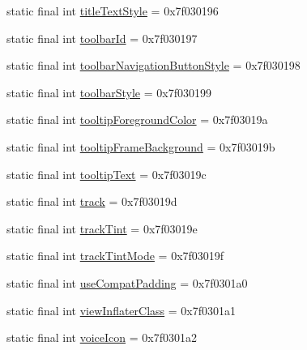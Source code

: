 \begin{DoxyCompactItemize}
\item 
static final int \mbox{\hyperlink{classandroid_1_1support_1_1design_1_1_r_1_1attr_a88a90fd7bafbbc05004a0a6e0420f6b9}{title\+Text\+Style}} = 0x7f030196
\item 
static final int \mbox{\hyperlink{classandroid_1_1support_1_1design_1_1_r_1_1attr_ae9f565520d2e78480db1dae46fccb81b}{toolbar\+Id}} = 0x7f030197
\item 
static final int \mbox{\hyperlink{classandroid_1_1support_1_1design_1_1_r_1_1attr_a9733b7b45c6e2fdfb80f9271d546762a}{toolbar\+Navigation\+Button\+Style}} = 0x7f030198
\item 
static final int \mbox{\hyperlink{classandroid_1_1support_1_1design_1_1_r_1_1attr_af57093ce0a51175955ed5221ab7b8067}{toolbar\+Style}} = 0x7f030199
\item 
static final int \mbox{\hyperlink{classandroid_1_1support_1_1design_1_1_r_1_1attr_ae847265357dd1bea6c55b9afd0710c84}{tooltip\+Foreground\+Color}} = 0x7f03019a
\item 
static final int \mbox{\hyperlink{classandroid_1_1support_1_1design_1_1_r_1_1attr_a098ba3f9d78cf2a09ce24aa2b4bfb1b6}{tooltip\+Frame\+Background}} = 0x7f03019b
\item 
static final int \mbox{\hyperlink{classandroid_1_1support_1_1design_1_1_r_1_1attr_a9974dd105066b1ce803fda4a5540bc3a}{tooltip\+Text}} = 0x7f03019c
\item 
static final int \mbox{\hyperlink{classandroid_1_1support_1_1design_1_1_r_1_1attr_a282e2c20f2ebb68f351c47e4b0b76a9a}{track}} = 0x7f03019d
\item 
static final int \mbox{\hyperlink{classandroid_1_1support_1_1design_1_1_r_1_1attr_abf5a10a01b2bddbdb4e0afa3d567f606}{track\+Tint}} = 0x7f03019e
\item 
static final int \mbox{\hyperlink{classandroid_1_1support_1_1design_1_1_r_1_1attr_a97828dd1c19f4389956878cac52bee6a}{track\+Tint\+Mode}} = 0x7f03019f
\item 
static final int \mbox{\hyperlink{classandroid_1_1support_1_1design_1_1_r_1_1attr_ad72f0347d232271e751f806750bd03ad}{use\+Compat\+Padding}} = 0x7f0301a0
\item 
static final int \mbox{\hyperlink{classandroid_1_1support_1_1design_1_1_r_1_1attr_a70e622bcd7a46007dc9c6a52f532d7fd}{view\+Inflater\+Class}} = 0x7f0301a1
\item 
static final int \mbox{\hyperlink{classandroid_1_1support_1_1design_1_1_r_1_1attr_ae9f87039b9605fa942ae35a81458ad77}{voice\+Icon}} = 0x7f0301a2
\item 

\end{DoxyCompactItemize}
